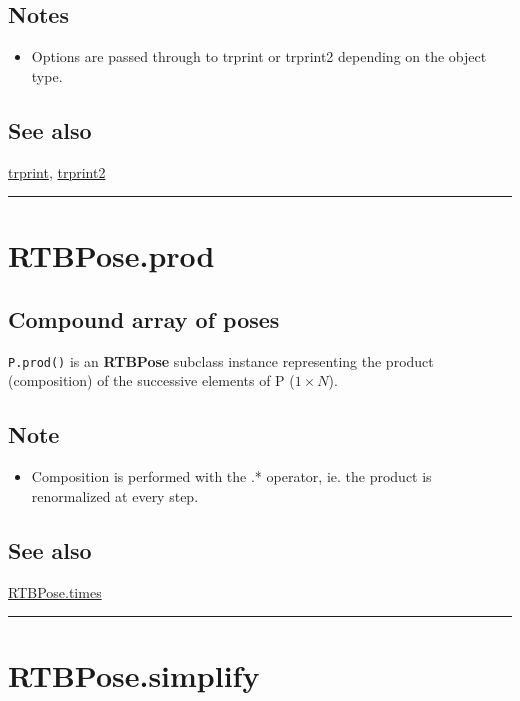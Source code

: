 \subsection*{Notes}
\begin{itemize}
  \item Options are passed through to trprint or trprint2 depending on the object    type.
\end{itemize}

\subsection*{See also}


\hyperlink{trprint}{\color{blue} trprint}, \hyperlink{trprint2}{\color{blue} trprint2}

\vspace{1.5ex}\hrule

\hypertarget{RTBPose.prod}{\section*{RTBPose.prod}}
\subsection*{Compound array of poses}


\texttt{P.prod()} is an \textbf{\color{red} RTBPose} subclass instance representing the product (composition) of the
successive elements of P ($1 \times N$).


\subsection*{Note}
\begin{itemize}
  \item Composition is performed with the .* operator, ie. the product is    renormalized at every step.
\end{itemize}

\subsection*{See also}


\hyperlink{RTBPose.times}{\color{blue} RTBPose.times}

\vspace{1.5ex}\hrule

\hypertarget{RTBPose.simplify}{\section*{RTBPose.simplify}}
